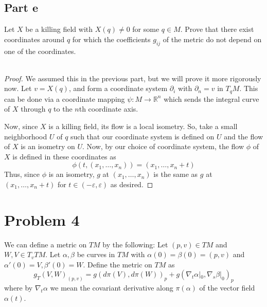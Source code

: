 \documentclass[fontsize=11pt]{scrartcl} %
\numberwithin{equation}{section} %
\numberwithin{figure}{section} %
\numberwithin{table}{section} %
\newcommand{\R}{\mathbb{R}}
\begin{document}
\subsection*{Part e}
Let $X$ be a killing field with $X(q)\neq 0$  for some $q\in M$. Prove that
there exist coordinates around $q$ for which the coefficients $g_{ij}$ of the
metric do not depend on one of the coordinates.
\\
\\
\begin{proof}
    We assumed this in the previous part, but we will prove it more rigorously
    now. Let $v=X(q)$, and form a coordinate system $\partial_i$ with
    $\partial_n = v$ in $T_qM$. This can be done via a coordinate mapping
    $\psi:M\to\R^n$ which sends the integral curve of $X$ through $q$ to the
    $n$th coordinate axis.

    Now, since $X$ is a killing field, its flow is a local isometry. So, take a
    small neighborhood $U$ of $q$ such that our coordinate system is defined on
    $U$ and the flow of $X$ is an isometry on $U$. Now, by our choice of
    coordinate system, the flow $\phi$ of $X$ is defined in these coordinates as
    \[
        \phi(t,(x_1,\dots,x_n)) = (x_1,\dots,x_n+t)
    \]
    Thus, since $\phi$ is an isometry, $g$ at $(x_1,\dots,x_n)$ is the same as
    $g$ at $(x_1,\dots,x_n+t)$ for $t\in (-\varepsilon,\varepsilon)$ as desired.
\end{proof}

\newpage

\section*{Problem 4}
We can define a metric on $TM$ by the following: Let $(p,v)\in TM$ and $W,V\in
T_vTM$. Let $\alpha,\beta$ be curves in $TM$ with $\alpha(0)=\beta(0)=(p,v)$ and
$\alpha'(0)=V,\beta'(0)=W$.
Define the metric on $TM$ as
\[
    g_T(V,W)_{(p,v)} = g(d\pi(V),d\pi(W))_p +
    g(\nabla_t\alpha|_0,\nabla_s\beta|_0)_p
\]
where by $\nabla_t\alpha$ we mean the covariant derivative along $\pi(\alpha)$
of the vector field $\alpha(t)$.
\end{document}
